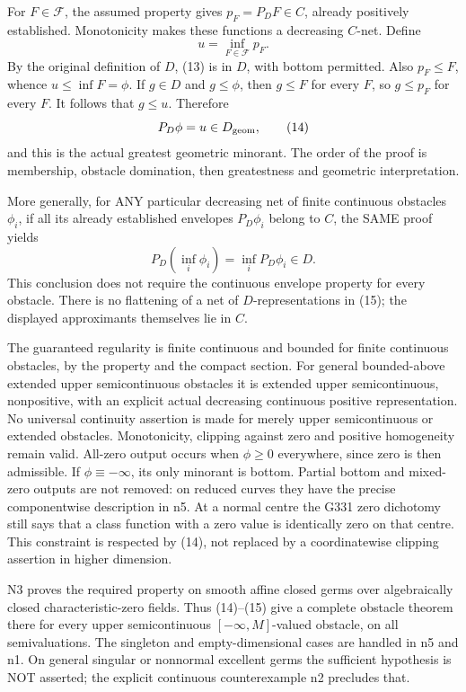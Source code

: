 \documentclass[11pt]{article}
\begin{document}
For \(F\in\mathcal F\), the assumed property gives \(p_F=P_DF\in C\), already positively established. Monotonicity makes these functions a decreasing \(C\)-net. Define
\[
u=\inf_{F\in\mathcal F}p_F. \tag{13}
\]
By the original definition of \(D\), (13) is in \(D\), with bottom permitted. Also \(p_F\le F\), whence \(u\le\inf F=\phi\). If \(g\in D\) and \(g\le\phi\), then \(g\le F\) for every \(F\), so \(g\le p_F\) for every \(F\). It follows that \(g\le u\). Therefore
\[
P_D\phi=u\in D_{\rm geom}, \tag{14}
\]
and this is the actual greatest geometric minorant. The order of the proof is membership, obstacle domination, then greatestness and geometric interpretation.

More generally, for ANY particular decreasing net of finite continuous obstacles \(\phi_i\), if all its already established envelopes \(P_D\phi_i\) belong to \(C\), the SAME proof yields
\[
P_D(\inf_i\phi_i)=\inf_i P_D\phi_i\in D. \tag{15}
\]
This conclusion does not require the continuous envelope property for every obstacle. There is no flattening of a net of \(D\)-representations in (15); the displayed approximants themselves lie in \(C\).

The guaranteed regularity is finite continuous and bounded for finite continuous obstacles, by the property and the compact section. For general bounded-above extended upper semicontinuous obstacles it is extended upper semicontinuous, nonpositive, with an explicit actual decreasing continuous positive representation. No universal continuity assertion is made for merely upper semicontinuous or extended obstacles. Monotonicity, clipping against zero and positive homogeneity remain valid. All-zero output occurs when \(\phi\ge0\) everywhere, since zero is then admissible. If \(\phi\equiv-\infty\), its only minorant is bottom. Partial bottom and mixed-zero outputs are not removed: on reduced curves they have the precise componentwise description in n5. At a normal centre the G331 zero dichotomy still says that a class function with a zero value is identically zero on that centre. This constraint is respected by (14), not replaced by a coordinatewise clipping assertion in higher dimension.

N3 proves the required property on smooth affine closed germs over algebraically closed characteristic-zero fields. Thus (14)--(15) give a complete obstacle theorem there for every upper semicontinuous \([-\infty,M]\)-valued obstacle, on all semivaluations. The singleton and empty-dimensional cases are handled in n5 and n1. On general singular or nonnormal excellent germs the sufficient hypothesis is NOT asserted; the explicit continuous counterexample n2 precludes that.
\end{document}
